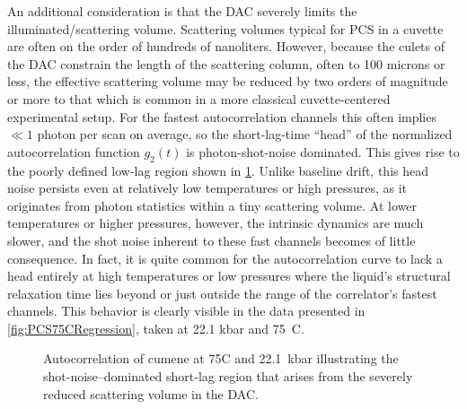 An additional consideration is that the DAC severely limits the illuminated/scattering volume. Scattering volumes typical for PCS in a cuvette are often on the order of hundreds of nanoliters. However, because the culets of the DAC constrain the length of the scattering column, often to 100 microns or less, the effective scattering volume may be reduced by two orders of magnitude or more to that which is common in a more classical cuvette-centered experimental setup. For the fastest autocorrelation channels this often implies $\ll 1$ photon per scan on average, so the short-lag-time ``head'' of the normalized autocorrelation function $g_{2}(t)$ is photon-shot-noise dominated. This gives rise to the poorly defined low-lag region shown in \fig \ref{fig:PCS75CHead}. Unlike baseline drift, this head noise persists even at relatively low temperatures or high pressures, as it originates from photon statistics within a tiny scattering volume. At lower temperatures or higher pressures, however, the intrinsic dynamics are much slower, and the shot noise inherent to these fast channels becomes of little consequence. In fact, it is quite common for the autocorrelation curve to lack a head entirely at high temperatures or low pressures where the liquid's structural relaxation time lies beyond or just outside the range of the correlator's fastest channels. This behavior is clearly visible in the data presented in \fig \ref{fig:PCS75CRegression}, taken at 22.1 kbar and 75~\textdegree C.

 
\begin{figure}[!htbp]
	\centering
	\caption{Autocorrelation of cumene at 75\textdegree C and \SI{22.1}{\kilo\bar} illustrating the shot-noise–dominated short-lag region that arises from the severely reduced scattering volume in the DAC.}
	
	
	\label{fig:PCS75CHead}
\end{figure}

